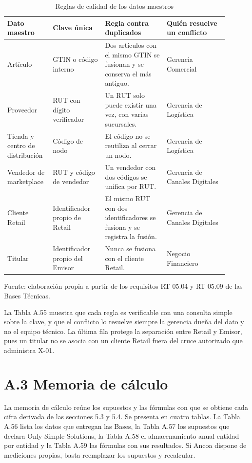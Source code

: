 \documentclass[11pt]{article}
\begin{document}
\begin{table}[htbp]
\caption{Reglas de calidad de los datos maestros}\label{tab:maestros_a}
\centering
\begin{tabular}{@{}p{0.160\linewidth}p{0.220\linewidth}p{0.261\linewidth}p{0.261\linewidth}@{}}
\toprule Dato maestro & Clave única & Regla contra duplicados & Quién resuelve un conflicto \\
\midrule
Artículo & GTIN o código interno & Dos artículos con el mismo GTIN se fusionan y se conserva el más antiguo. & Gerencia Comercial \\
Proveedor & RUT con dígito verificador & Un RUT solo puede existir una vez, con varias sucursales. & Gerencia de Logística \\
Tienda y centro de distribución & Código de nodo & El código no se reutiliza al cerrar un nodo. & Gerencia de Logística \\
Vendedor de marketplace & RUT y código de vendedor & Un vendedor con dos códigos se unifica por RUT. & Gerencia de Canales Digitales \\
Cliente Retail & Identificador propio de Retail & El mismo RUT con dos identificadores se fusiona y se registra la fusión. & Gerencia de Canales Digitales \\
Titular & Identificador propio del Emisor & Nunca se fusiona con el cliente Retail. & Negocio Financiero \\
\bottomrule
\end{tabular}
\par\smallskip
{\raggedright Fuente: elaboración propia a partir de los requisitos RT-05.04 y RT-05.09 de las Bases Técnicas.\par}
\end{table}


La Tabla A.55 muestra que cada regla es verificable con una consulta simple sobre la clave, y que el conflicto lo resuelve siempre la gerencia dueña del dato y no el equipo técnico. La última fila protege la separación entre Retail y Emisor, pues un titular no se asocia con un cliente Retail fuera del cruce autorizado que administra X-01.

\section{A.3 Memoria de cálculo}

La memoria de cálculo reúne los supuestos y las fórmulas con que se obtiene cada cifra derivada de las secciones 5.3 y 5.4. Se presenta en cuatro tablas. La Tabla A.56 lista los datos que entregan las Bases, la Tabla A.57 los supuestos que declara Only Simple Solutions, la Tabla A.58 el almacenamiento anual entidad por entidad y la Tabla A.59 las fórmulas con sus resultados. Si Ancoa dispone de mediciones propias, basta reemplazar los supuestos y recalcular.
\end{document}
